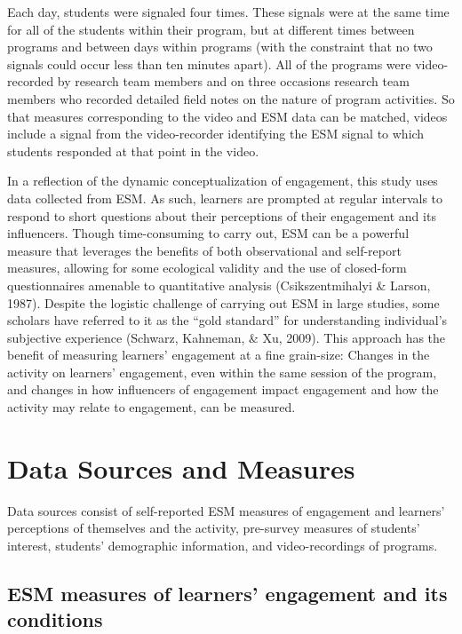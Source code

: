 \documentclass[]{book}
\theoremstyle{definition}
\theoremstyle{definition}
\theoremstyle{definition}
\theoremstyle{remark}
\begin{document}
Each day, students were signaled four times. These signals were at the
same time for all of the students within their program, but at different
times between programs and between days within programs (with the
constraint that no two signals could occur less than ten minutes apart).
All of the programs were video-recorded by research team members and on
three occasions research team members who recorded detailed field notes
on the nature of program activities. So that measures corresponding to
the video and ESM data can be matched, videos include a signal from the
video-recorder identifying the ESM signal to which students responded at
that point in the video.

In a reflection of the dynamic conceptualization of engagement, this
study uses data collected from ESM. As such, learners are prompted at
regular intervals to respond to short questions about their perceptions
of their engagement and its influencers. Though time-consuming to carry
out, ESM can be a powerful measure that leverages the benefits of both
observational and self-report measures, allowing for some ecological
validity and the use of closed-form questionnaires amenable to
quantitative analysis (Csikszentmihalyi \& Larson, 1987). Despite the
logistic challenge of carrying out ESM in large studies, some scholars
have referred to it as the ``gold standard'' for understanding
individual's subjective experience (Schwarz, Kahneman, \& Xu, 2009).
This approach has the benefit of measuring learners' engagement at a
fine grain-size: Changes in the activity on learners' engagement, even
within the same session of the program, and changes in how influencers
of engagement impact engagement and how the activity may relate to
engagement, can be measured.

\section{Data Sources and Measures}\label{data-sources-and-measures}

Data sources consist of self-reported ESM measures of engagement and
learners' perceptions of themselves and the activity, pre-survey
measures of students' interest, students' demographic information, and
video-recordings of programs.

\subsection{ESM measures of learners' engagement and its
conditions}\label{esm-measures-of-learners-engagement-and-its-conditions}
\end{document}
